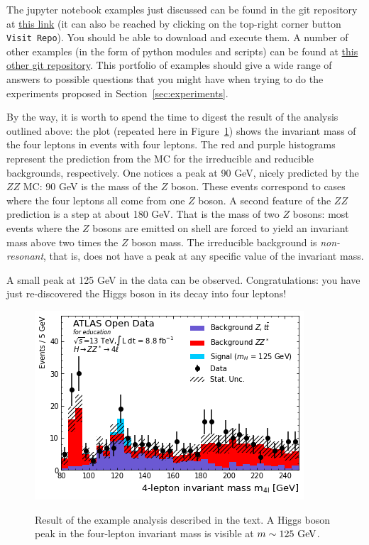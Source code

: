 The jupyter notebook examples just discussed can be found in the git repository at \href{https://github.com/atlas-outreach-data-tools/notebooks-collection-opendata/tree/e728ef8edd2f4b1834dccf15334f1da454343fb2}{this link} (it can also be reached by clicking on the top-right corner button \verb|Visit Repo|). You should be able to download and execute them. A number of other examples (in the form of python modules and scripts) can be found at \href{https://github.com/atlas-outreach-data-tools/atlas-outreach-Python-uproot-framework-13tev}{this other git repository}. This portfolio of examples should give a wide range of answers to possible questions that you might have when trying to do the experiments proposed in Section~\ref{sec:experiments}. 

By the way, it is worth to spend the time to digest the result of the analysis outlined above: the plot (repeated here in Figure~\ref{fig:H_4lep}) shows the invariant mass of the four leptons in events with four leptons. The red and purple histograms represent the prediction from the MC for the irreducible and reducible backgrounds, respectively. One notices a peak at 90 GeV, nicely predicted by the $ZZ$ MC: 90 GeV is the mass of the $Z$ boson. These events correspond to cases where the four leptons all come from one $Z$ boson. A second feature of the $ZZ$ prediction is a step at about 180 GeV. That is the mass of two $Z$ bosons: most events where the $Z$ bosons are emitted on shell are forced to yield an invariant mass above two times the $Z$ boson mass. The irreducible background is \textit{non-resonant}, that is, does not have a peak at any specific value of the invariant mass.

A small peak at 125 GeV in the data can be observed. Congratulations: you have just re-discovered the Higgs boson in its decay into four leptons! 

\begin{figure}[tb] 
	\centering
	\includegraphics[width=0.5\columnwidth]{Figures/H_4lep.png}
	\label{fig:H_4lep}
	\caption{Result of the example analysis described in the text. A Higgs boson peak in the four-lepton invariant mass is visible at $ m \sim 125\ \text{Ge\kern -0.1em V}$.}
\end{figure}


